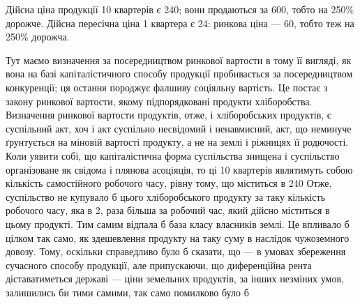\noindent{}Дійсна ціна продукції 10 квартерів є 240; вони продаються за 600, тобто на 250\% дорожче.
Дійсна пересічна ціна 1 квартера є 24: ринкова ціна — 60, тобто теж на 250\% дорожча.

Тут маємо визначення за посередництвом ринкової вартости в тому її вигляді, як вона на базі
капіталістичного способу продукції пробивається за посередництвом конкуренції; ця остання породжує
фалшиву соціяльну вартість. Це постає з закону ринкової вартости, якому підпорядковані продукти
хліборобства.
Визначення ринкової вартости продуктів, отже, і хліборобських продуктів, є суспільний акт, хоч і акт
суспільно несвідомий і ненавмисний, акт, що неминуче ґрунтується на міновій вартості продукту, а не
на землі і ріжницях її родючості. Коли уявити собі, що капіталістична форма суспільства знищена і
суспільство організоване як свідома і плянова асоціяція, то ці 10 квартерів являтимуть собою
кількість самостійного робочого часу, рівну тому, що міститься в 240 Отже, суспільство не
купувало б цього хліборобського продукту за таку кількість робочого часу, яка в 2, раза більша
за робочий час, який дійсно міститься в цьому продукті. Тим самим відпала б база класу власників
землі. Це впливало б цілком так само, як здешевлення продукту на таку суму в наслідок чужоземного
довозу. Тому, оскільки справедливо було б сказати, що — в умовах збереження сучасного способу
продукції, але припускаючи, що диференційна рента діставатиметься державі — ціни земельних
продуктів, за інших незміних умов, залишились би тими самими, так само помилково було б
\parbreak{}  %
